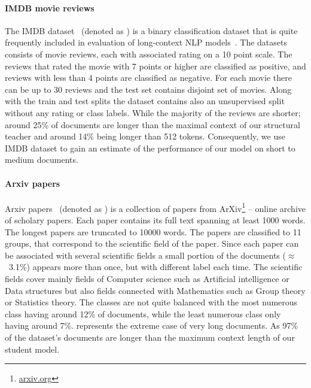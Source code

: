\paragraph{IMDB movie reviews} The IMDB dataset~\citep{maas2011learning}
(denoted as ) is a binary classification dataset that is quite
frequently included in evaluation of long-context NLP
models~\citep{zaheer2020big, beltagy2020longformer, le2014distributed}. The
datasets consists of movie reviews, each with associated rating on a 10 point
scale. The reviews that rated the movie with 7 points or higher are classified
as positive, and reviews with less than 4 points are classified as negative.
For each movie there can be up to 30 reviews and the test set contains disjoint
set of movies. Along with the train and test splits the dataset contains also
an unsupervised split without any rating or class labels. While the majority of
the reviews are shorter; around 25\% of documents are longer than the maximal
context of our structural teacher and around 14\% being longer than 512 tokens.
Consequently, we use IMDB dataset to gain an estimate of the performance of our
model on short to medium documents.

\paragraph{Arxiv papers} Arxiv papers~\citep{arxiv_papers} (denoted as
) is a collection of papers from ArXiv\footnote{\url{arxiv.org}} --
online archive of scholary papers. Each paper contains its full text spanning
at least 1000 words. The longest papers are truncated to 10000 words. The
papers are classified to 11 groups, that correspond to the scientific field of
the paper. Since each paper can be associated with several scientific fields a
small portion of the documents ($\approx$~3.1\%) appears more than once, but
with different label each time. The scientific fields cover mainly fields of
Computer science such as Artificial intelligence or Data structures but also
fields connected with Mathematics such as Group theory or Statistics theory.
The classes are not quite balanced with the most numerous class having around
12\% of documents, while the least numerous class only having around 7\%.
 represents the extreme case of very long documents. As 97\% of the
dataset's documents are longer than the maximum context length of our student
model.


